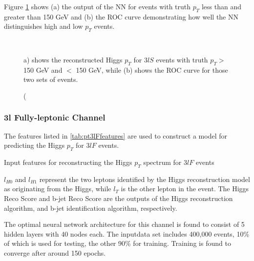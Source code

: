 Figure \ref{fig:pt3lSroc} shows (a) the output of the NN for events with truth $p_T$ less than and greater than 150 GeV and (b) the ROC curve demonstrating how well the NN distinguishes high and low $p_T$ events. 

\begin{figure}[H]                                                                    
    \centering                                                                                     
    \\
    \caption(a) shows the reconstructed Higgs $p_T$ for $3lS$ events with truth $p_T > $ 150 GeV and $<$ 150 GeV, while (b) shows the ROC curve for those two sets of events.
    \label{fig:pt3lSroc}
\end{figure}


\subsubsection{3l Fully-leptonic Channel}
\label{subsec:pt3lF}

The features listed in \ref{tab:pt3lFfeatures} are used to construct a model for predicting the Higgs $p_T$ for $3lF$ events.

\begin{table}[H]

  \caption{Input features for reconstructing the Higgs $p_T$ spectrum for $3lF$ events}
  \label{tab:pt3lFfeatures}
\end{table}

$l_{H0}$ and $l_{H1}$ represent the two leptons identified by the Higgs reconstruction model as originating from the Higgs, while $l_T$ is the other lepton in the event. The Higgs Reco Score and b-jet Reco Score are the outputs of the Higgs reconstruction algorithm, and b-jet identification algorithm, respectively.

The optimal neural network architecture for this channel is found to consist of 5 hidden layers with 40 nodes each. The inputdata set includes 400,000 events, 10\% of which is used for testing, the other 90\% for training. Training is found to converge after around 150 epochs.

